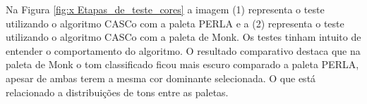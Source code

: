 Na Figura \ref{fig:x Etapas_de_teste_cores} a imagem (1) representa o teste utilizando o algoritmo CASCo com a paleta PERLA e a (2) representa o teste utilizando o algoritmo CASCo com a paleta de Monk. Os testes tinham intuito de entender o comportamento do algoritmo. O resultado comparativo destaca que na paleta de Monk o tom classificado ficou mais escuro comparado a paleta PERLA, apesar de ambas terem a mesma cor dominante selecionada. O que está relacionado a distribuições de tons entre as paletas. 